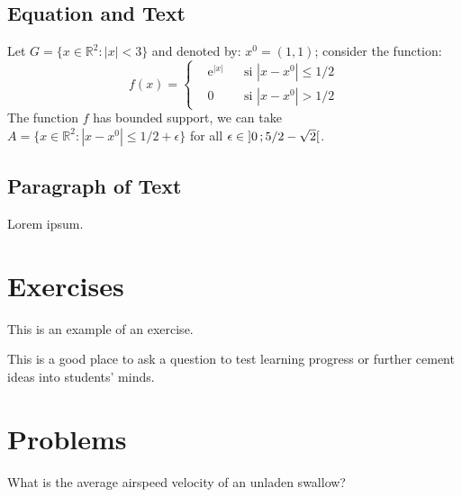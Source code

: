 \documentclass[11pt, fleqn, spanish]{book}
\begin{document}
\subsection{Equation and Text}

\begin{example}
Let $G=\{x\in\mathbb{R}^2:|x|<3\}$ and denoted by: $x^0=(1,1)$; consider the function:
\begin{equation}
f(x)=\left\{\begin{aligned} & \mathrm{e}^{|x|} & & \text{si $|x-x^0|\leq 1/2$}\\
& 0 & & \text{si $|x-x^0|> 1/2$}\end{aligned}\right.
\end{equation}
The function $f$ has bounded support, we can take $A=\{x\in\mathbb{R}^2:|x-x^0|\leq 1/2+\epsilon\}$ for all $\epsilon\in\mathopen{]}0\,;5/2-\sqrt{2}\mathclose{[}$.
\end{example}

\subsection{Paragraph of Text}

\begin{example}
 Lorem ipsum.
\end{example}


\section{Exercises}

This is an example of an exercise.

\begin{exercise}
This is a good place to ask a question to test learning progress or further cement ideas into students' minds.
\end{exercise}


\section{Problems}

\begin{problem}
What is the average airspeed velocity of an unladen swallow?
\end{problem}
\end{document}
